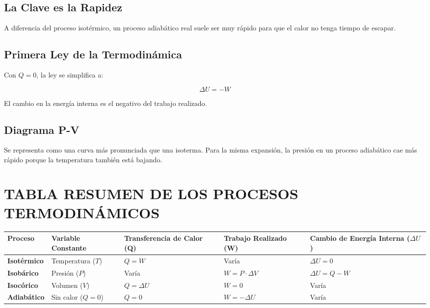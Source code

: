 \documentclass{article}
\begin{document}
\subsection*{La Clave es la Rapidez}

A diferencia del proceso isotérmico, un proceso adiabático real suele ser muy rápido para que el calor no tenga tiempo de escapar.

\subsection*{Primera Ley de la Termodinámica}

Con $Q = 0$, la ley se simplifica a:

$$\Delta U = -W$$

El cambio en la energía interna es el negativo del trabajo realizado.

\subsection*{Diagrama P-V}

Se representa como una curva más pronunciada que una isoterma. Para la misma expansión, la presión en un proceso adiabático cae más rápido porque la temperatura también está bajando.

\vspace{5mm}

\section*{TABLA RESUMEN DE LOS PROCESOS TERMODINÁMICOS}

\begin{center}
\begin{tabular}{|p{2.5cm}|p{2.5cm}|p{2.5cm}|p{2.5cm}|p{2.5cm}|}
\hline
\textbf{Proceso} & \textbf{Variable Constante} & \textbf{Transferencia de Calor (Q)} & \textbf{Trabajo Realizado (W)} & \textbf{Cambio de Energía Interna ($\Delta U$)} \\
\hline\hline
\textbf{Isotérmico} & Temperatura ($T$) & $Q = W$ & Varía & $\Delta U = 0$ \\
\hline
\textbf{Isobárico} & Presión ($P$) & Varía & $W = P \cdot \Delta V$ & $\Delta U = Q - W$ \\
\hline
\textbf{Isocórico} & Volumen ($V$) & $Q = \Delta U$ & $W = 0$ & Varía \\
\hline
\textbf{Adiabático} & Sin calor ($Q = 0$) & $Q = 0$ & $W = -\Delta U$ & Varía \\
\hline
\end{tabular}
\end{center}
\end{document}
